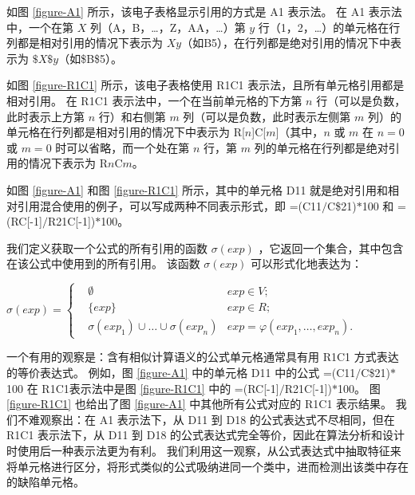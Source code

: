 

如图 \ref{figure-A1} 所示，该电子表格显示引用的方式是 A1 表示法。
在 A1 表示法中，一个在第 $X$ 列（A，B，\dots，Z，AA，\dots）第 $y$ 行（1，2，\dots）的单元格在行列都是相对引用的情况下表示为 $Xy$（如B5），在行列都是绝对引用的情况下中表示为 $\$X\$y$（如\$B\$5）。



如图 \ref{figure-R1C1} 所示，该电子表格使用 R1C1 表示法，且所有单元格引用都是相对引用。
在 R1C1 表示法中，一个在当前单元格的下方第 $n$ 行（可以是负数，此时表示上方第 $n$ 行）和右侧第 $m$ 列（可以是负数，此时表示左侧第 $m$ 列）的单元格在行列都是相对引用的情况下中表示为 R[$n$]C[$m$]（其中，$n$ 或 $m$ 在 $n=0$ 或 $m=0$ 时可以省略，而一个处在第 $n$ 行，第 $m$ 列的单元格在行列都是绝对引用的情况下表示为 R$n$C$m$。

如图 \ref{figure-A1} 和图 \ref{figure-R1C1} 所示，其中的单元格 D11 就是绝对引用和相对引用混合使用的例子，可以写成两种不同表示形式，即 =(C11$/$C\$21)$*$100 和 =(RC[-1]$/$R21C[-1])$*$100。

我们定义获取一个公式的所有引用的函数 $\sigma(exp)$ ，它返回一个集合，其中包含在该公式中使用到的所有引用。
该函数 $\sigma(exp)$ 可以形式化地表达为：
\begin{definition}
$
\sigma(exp) = 
\left\{
    \begin{aligned}
       & \emptyset & exp \in V; \\
       & \{exp\}     & exp \in R; \\
       & \sigma(exp_1) \cup \dots \cup \sigma(exp_n) & exp = \varphi(exp_1, \dots , exp_n).
    \end{aligned}
\right.
$
\end{definition}

一个有用的观察是：含有相似计算语义的公式单元格通常具有用 R1C1 方式表达的等价表达式。
例如，图 \ref{figure-A1} 中的单元格 D11 中的公式 =(C11$/$C\$21)$*$100 在 R1C1表示法中是图 \ref{figure-R1C1} 中的 =(RC[-1]$/$R21C[-1])$*$100。
图 \ref{figure-R1C1} 也给出了图 \ref{figure-A1} 中其他所有公式对应的 R1C1 表示结果。
我们不难观察出：在 A1 表示法下，从 D11 到 D18 的公式表达式不尽相同，但在 R1C1 表示法下，从 D11 到 D18 的公式表达式完全等价，因此在算法分析和设计时使用后一种表示法更为有利。
我们利用这一观察，从公式表达式中抽取特征来将单元格进行区分，将形式类似的公式吸纳进同一个类中，进而检测出该类中存在的缺陷单元格。



